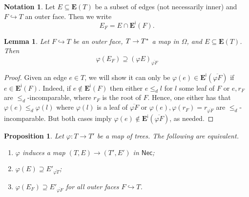 \documentclass[a4paper,10pt
,draft
]{article}%
\numberwithin{equation}{section}
\numberwithin{figure}{section}
\newtheorem{lemma}[equation]{Lemma}%
\newtheorem{proposition}[equation]{Proposition}%
\theoremstyle{definition} %
\newtheorem{notation}[equation]{Notation}%
\newcommand{\1}{\ensuremath{\mathbbm 1}}%
\begin{document}
\begin{notation}
	Let $E \subseteq \boldsymbol{E}(T)$
	be a subset of edges (not necessarily inner)
	and $F \hookrightarrow T$ an outer face.
	Then we write
	\[
	E_F = E \cap \boldsymbol{E}^{\mathsf{i}}(F).
	\]
\end{notation}


\begin{lemma}\label{EFPHI LEM}
	Let $F \hookrightarrow T$
	be an outer face,
	$T \to T^{\**}$ a map in $\Omega$,
	and $E \subseteq \boldsymbol{E}(T)$.
	Then
	\[
	\varphi(E_F) 
	\supseteq 
	\left(\varphi E\right)_{\overline{\varphi F}}
	\]
\end{lemma}


\begin{proof}
Given an edge $e \in T$, 
we will show it can only be 
$\varphi(e) \in \boldsymbol{E}^{\mathsf{i}}
(\overline{\varphi F})$ if
$e \in \boldsymbol{E}^{\mathsf{i}}
(F)$.
Indeed, if $e \nin \boldsymbol{E}^{\mathsf{i}}
(F)$
then either $e \leq_d l$ for $l$ some leaf of $F$
or $e,r_F$ are $\leq_d$-incomparable, where $r_F$ is the root of $F$.
Hence, one either has that
$\varphi(e) \leq_d \varphi(l)$ where $\varphi(l)$ is a leaf of 
$\overline{\varphi F}$
or
$\varphi(e),\varphi(r_F) = r_{\overline{\varphi F}}$
are $\leq_d$-incomparable. But both cases imply 
$\varphi(e) \nin \boldsymbol{E}^{\mathsf{i}}
(\overline{\varphi F})$, as needed.
\end{proof}



\begin{proposition}\label{NECKMAPCHAR PROP}
	Let $\varphi \colon T \to T'$ be a map of trees. 
	The following are equivalent.
\begin{enumerate}[label=(\roman*)]
\item $\varphi$ induces a map 
	$(T,E) \to (T',E')$ in $\mathsf{Nec}$;
\item $\varphi (E) \supseteq E'_{\overline{\varphi T}}$;
\item $\varphi (E_F) \supseteq E'_{\overline{\varphi F}}$
	for all outer faces $F \hookrightarrow T$.
\end{enumerate}
\end{proposition}
\end{document}
